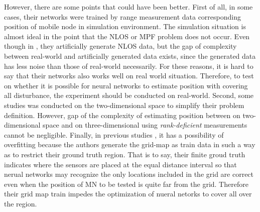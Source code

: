 \documentclass{ieeeaccess}
\begin{document}
However, there are some points that could have been better. First of all, in some cases, their networks were trained by range measurement data corresponding position of mobile node in simulation environment\cite{chatterjee2010fletcher, shareef2008localization, rahman2009localization, singh2013tdoa, banihashemian2018new}. The simulation situation is almost ideal in the point that the NLOS or MPF problem does not occur. Even though in \cite{rahman2009localization}, they artificially generate NLOS data, but the gap of complexity between real-world and artificially generated data exists, since the generated data has less noise than those of real-world necessarily. For these reasons, it is hard to say that their networks also works well on real world situation. Therefore, to test on whether it is possible for neural networks to estimate position with covering all disturbance, the experiment should be conducted on real-world. 
Second, some studies was conducted on the two-dimensional space to simplify their problem definition\cite{shareef2008localization, rahman2009localization, singh2013tdoa,bernas2015fully, kumar2016localization, banihashemian2018new}. However, gap of the complexity of estimating position between on two-dimensional space and on three-dimensional using \textit{rank-deficient} measurements cannot be negligible. Finally, in previous studies \cite{shareef2008localization, rahman2009localization, singh2013tdoa,kumar2016localization}, it has a possibility of overfitting because the authors generate the grid-map as train data in such a way as to restrict their ground truth region. That is to say, their finite groud truth indicates where the sensors are placed at the equal distance interval so that nerual networks may recognize the only locations included in the grid are correct even when the position of MN to be tested is quite far from the grid. Therefore their grid map train impedes the optimization of nueral netorks to cover all over the region.

%
 

\end{document}
